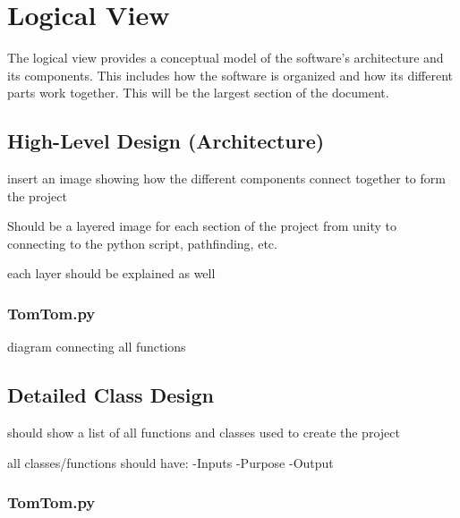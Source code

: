 \section{Logical View}

The logical view provides a conceptual model of the software's architecture and its components. 
This includes how the software is organized and how its different parts work together.
This will be the largest section of the document.

\subsection{High-Level Design (Architecture)}

insert an image showing how the different components connect together to form the project

Should be a layered image for each section of the project from unity to connecting to the python script, pathfinding, etc.

each layer should be explained as well

\subsubsection{TomTom.py}

diagram connecting all functions

\subsection{Detailed Class Design}

should show a list of all functions and classes used to create the project

all classes/functions should have:
-Inputs
-Purpose
-Output

\subsubsection{TomTom.py}

